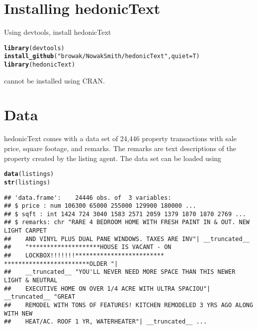 \documentclass{article}\usepackage[]{graphicx}\usepackage[]{color}
\makeatletter
\newcommand{\hlstr}[1]{\textcolor[rgb]{0.192,0.494,0.8}{#1}}%
\newcommand{\hlstd}[1]{\textcolor[rgb]{0.345,0.345,0.345}{#1}}%
\newcommand{\hlkwc}[1]{\textcolor[rgb]{0.333,0.667,0.333}{#1}}%
\newcommand{\hlkwd}[1]{\textcolor[rgb]{0.737,0.353,0.396}{\textbf{#1}}}%
\newenvironment{kframe}{%
 \def\at@end@of@kframe{}%
 \ifinner\ifhmode%
  \def\at@end@of@kframe{\end{minipage}}%
  \begin{minipage}{\columnwidth}%
 \fi\fi%
 \def\FrameCommand##1{\hskip\@totalleftmargin \hskip-\fboxsep
 \colorbox{shadecolor}{##1}\hskip-\fboxsep
     \hskip-\linewidth \hskip-\@totalleftmargin \hskip\columnwidth}%
 \MakeFramed {\advance\hsize-\width
   \@totalleftmargin\z@ \linewidth\hsize
   \@setminipage}}%
 {\par\unskip\endMakeFramed%
 \at@end@of@kframe}
\newenvironment{knitrout}{}{} %
\newcommand{\pkg}[1]{{\fontseries{b}\selectfont #1}}
\makeatother
\begin{document}
\section{Installing \pkg{hedonicText}}
Using \pkg{devtools}, install \pkg{hedonicText}
\begin{knitrout}\footnotesize
{}\color{fgcolor}\begin{kframe}
\begin{alltt}
\hlkwd{library}\hlstd{(devtools)}
\hlkwd{install_github}\hlstd{(}\hlstr{"browak/NowakSmith/hedonicText"} \hlstd{,} \hlkwc{quiet}\hlstd{=T)}
\hlkwd{library}\hlstd{(hedonicText)}
\end{alltt}
\end{kframe}
\end{knitrout}
\noindent \pkg{hedonicText} cannot be installed using CRAN.

\section{Data}
\pkg{hedonicText} comes with a data set of 24,446 property transactions with sale price, square footage, and remarks.  The remarks are text descriptions of the property created by the listing agent.  The data set can be loaded using
\begin{knitrout}\footnotesize
{}\color{fgcolor}\begin{kframe}
\begin{alltt}
\hlkwd{data}\hlstd{(listings)}
\hlkwd{str}\hlstd{(listings)}
\end{alltt}
\begin{verbatim}
## 'data.frame':	24446 obs. of  3 variables:
## $ price : num 106300 65000 255000 129900 180000 ...
## $ sqft : int 1424 724 3040 1583 2571 2059 1379 1870 1870 2769 ...
## $ remarks: chr "RARE 4 BEDROOM HOME WITH FRESH PAINT IN & OUT. NEW LIGHT CARPET
##    AND VINYL PLUS DUAL PANE WINDOWS. TAXES ARE INV"| __truncated__
##    "********************HOUSE IS VACANT - ON
##    LOCKBOX!!!!!!!************************* ************************OLDER "|
##    __truncated__ "YOU'LL NEVER NEED MORE SPACE THAN THIS NEWER LIGHT & NEUTRAL
##    EXECUTIVE HOME ON OVER 1/4 ACRE WITH ULTRA SPACIOU"| __truncated__ "GREAT
##    REMODEL WITH TONS OF FEATURES! KITCHEN REMODELED 3 YRS AGO ALONG WITH NEW
##    HEAT/AC. ROOF 1 YR, WATERHEATER"| __truncated__ ...
\end{verbatim}
\end{kframe}
\end{knitrout}
\end{document}

